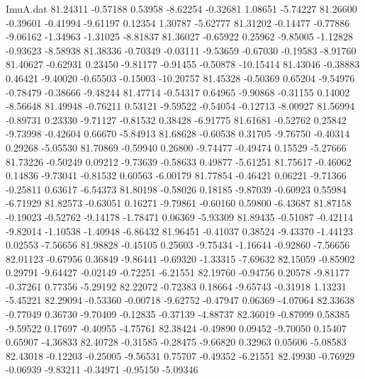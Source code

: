 \begin{filecontents}{ImuA.dat}
  81.24311   -0.57188    0.53958   -8.62254   -0.32681    1.08651   -5.74227
  81.26600   -0.39601   -0.41994   -9.61197    0.12354    1.30787   -5.62777
  81.31202   -0.14477   -0.77886   -9.06162   -1.34963   -1.31025   -8.81837
  81.36027   -0.65922    0.25962   -9.85005   -1.12828   -0.93623   -8.58938
  81.38336   -0.70349   -0.03111   -9.53659   -0.67030   -0.19583   -8.91760
  81.40627   -0.62931    0.23450   -9.81177   -0.91455   -0.50878  -10.15414
  81.43046   -0.38883    0.46421   -9.40020   -0.65503   -0.15003  -10.20757
  81.45328   -0.50369    0.65204   -9.54976   -0.78479   -0.38666   -9.48244
  81.47714   -0.54317    0.64965   -9.90868   -0.31155    0.14002   -8.56648
  81.49948   -0.76211    0.53121   -9.59522   -0.54054   -0.12713   -8.00927
  81.56994   -0.89731    0.23330   -9.71127   -0.81532    0.38428   -6.91775
  81.61681   -0.52762    0.25842   -9.73998   -0.42604    0.66670   -5.84913
  81.68628   -0.60538    0.31705   -9.76750   -0.40314    0.29268   -5.05530
  81.70869   -0.59940    0.26800   -9.74477   -0.49474    0.15529   -5.27666
  81.73226   -0.50249    0.09212   -9.73639   -0.58633    0.49877   -5.61251
  81.75617   -0.46062    0.14836   -9.73041   -0.81532    0.60563   -6.00179
  81.77854   -0.46421    0.06221   -9.71366   -0.25811    0.63617   -6.54373
  81.80198   -0.58026    0.18185   -9.87039   -0.60923    0.55984   -6.71929
  81.82573   -0.63051    0.16271   -9.79861   -0.60160    0.59800   -6.43687
  81.87158   -0.19023   -0.52762   -9.14178   -1.78471    0.06369   -5.93309
  81.89435   -0.51087   -0.42114   -9.82014   -1.10538   -1.40948   -6.86432
  81.96451   -0.41037    0.38524   -9.43370   -1.44123    0.02553   -7.56656
  81.98828   -0.45105    0.25603   -9.75434   -1.16644   -0.92860   -7.56656
  82.01123   -0.67956    0.36849   -9.86441   -0.69320   -1.33315   -7.69632
  82.15059   -0.85902    0.29791   -9.64427   -0.02149   -0.72251   -6.21551
  82.19760   -0.94756    0.20578   -9.81177   -0.37261    0.77356   -5.29192
  82.22072   -0.72383    0.18664   -9.65743   -0.31918    1.13231   -5.45221
  82.29094   -0.53360   -0.00718   -9.62752   -0.47947    0.06369   -4.07064
  82.33638   -0.77049    0.36730   -9.70409   -0.12835   -0.37139   -4.88737
  82.36019   -0.87099    0.58385   -9.59522    0.17697   -0.40955   -4.75761
  82.38424   -0.49890    0.09452   -9.70050    0.15407    0.65907   -4.36833
  82.40728   -0.31585   -0.28475   -9.66820    0.32963    0.05606   -5.08583
  82.43018   -0.12203   -0.25005   -9.56531    0.75707   -0.49352   -6.21551
  82.49930   -0.76929   -0.06939   -9.83211   -0.34971   -0.95150   -5.09346

\end{filecontents}
